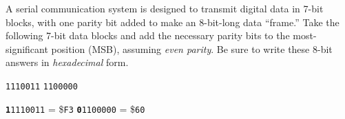 

A serial communication system is designed to transmit digital data in 7-bit blocks, with one parity bit added to make an 8-bit-long data ``frame.''  Take the following 7-bit data blocks and add the necessary parity bits to the most-significant position (MSB), assuming {\it even parity}.  Be sure to write these 8-bit answers in {\it hexadecimal} form.

\vskip 10pt

{\tt 1110011} \hskip 100pt {\tt 1100000}

\vskip 10pt







{\tt {\bf 1}1110011} = \${\tt F3}   \hskip 100pt {\tt {\bf 0}1100000} = \${\tt 60}












